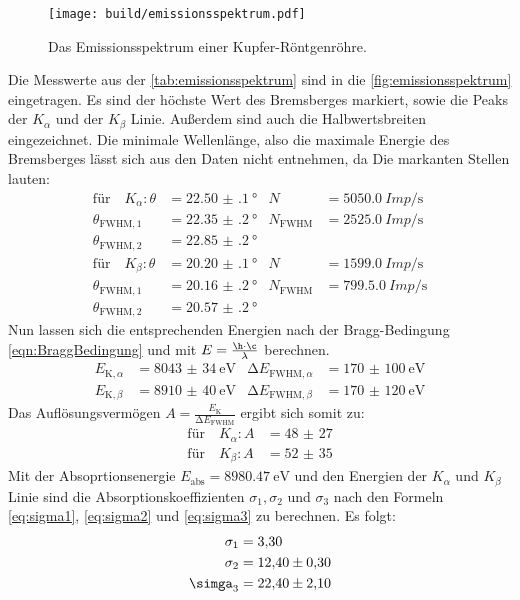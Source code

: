\begin{figure}[H]
  \centering
  \texttt{[image: build/emissionsspektrum.pdf]}
  \caption{Das Emissionsspektrum einer Kupfer-Röntgenröhre.}
  \label{fig:emissionsspektrum}
\end{figure}

\noindent
Die Messwerte aus der \autoref{tab:emissionsspektrum} sind in die \autoref{fig:emissionsspektrum} eingetragen. Es sind der höchste Wert des Bremsberges markiert,
sowie die Peaks der $K_{\alpha}$ und der $K_{\beta}$ Linie. Außerdem sind auch die Halbwertsbreiten eingezeichnet.
Die minimale Wellenlänge, also die maximale Energie des Bremsberges lässt sich aus den Daten nicht entnehmen, da %
Die markanten Stellen lauten:
\begin{align*}
  \text{für} \quad K_{\alpha}: \theta &= \SI{22.50(10)}{\degree} & N &= \SI{5050.0}{Imp\per\second} \\
              \theta_{\text{FWHM}, 1} &= \SI{22.35(20)}{\degree} & N_{\text{FWHM}} &= \SI{2525.0}{Imp\per\second} \\
              \theta_{\text{FWHM}, 2} &= \SI{22.85(20)}{\degree}  \\
  \text{für} \quad K_{\beta}: \theta &= \SI{20.20(10)}{\degree} & N &= \SI{1599.0}{Imp\per\second} \\
              \theta_{\text{FWHM}, 1} &= \SI{20.16(20)}{\degree} & N_{\text{FWHM}} &= \SI{799.5.0}{Imp\per\second} \\
              \theta_{\text{FWHM}, 2} &= \SI{20.57(20)}{\degree}  
\end{align*}
Nun lassen sich die entsprechenden Energien nach der Bragg-Bedingung \eqref{eqn:BraggBedingung} und mit $E = \frac{\h \cdot \c}{\lambda} $ berechnen. 
\begin{align*}
  E_{\text{K}, \alpha} &= \SI{8043(34)}{\electronvolt} & \increment E_{\text{FWHM}, \alpha } &= \SI{170(100)}{\electronvolt}\\
  E_{\text{K}, \beta} &= \SI{8910(40)}{\electronvolt}  & \increment E_{\text{FWHM}, \beta } &= \SI{170(120)}{\electronvolt}
\end{align*}
Das Auflösungsvermögen $A = \frac{E_{\text{K}}}{\increment E_{\text{FWHM}}}$ ergibt sich somit zu:
\begin{align*}
  \text{für} \quad K_{\alpha}: A&= \num{48(27)}\\
  \text{für} \quad K_{\beta}: A&= \num{52(35)}
\end{align*}
Mit der Absoprtionsenergie $E_{\text{abs}} = \SI{8980.47}{\electronvolt}$ \cite{E_abs} und den Energien der $K_{\alpha}$ und $K_{\beta}$ Linie sind die 
Absorptionskoeffizienten $\sigma_1, \sigma_2$ und $\sigma_3$ nach den Formeln \eqref{eq:sigma1}, \eqref{eq:sigma2} und \eqref{eq:sigma3} zu berechnen.
Es folgt:
\begin{align*}
  \sigma_1 &= \num{3.30}\\
  \sigma_2 &= \num{12.40(30)}\\
  \simga_3 &= \num{22.40(210)}
\end{align*}



